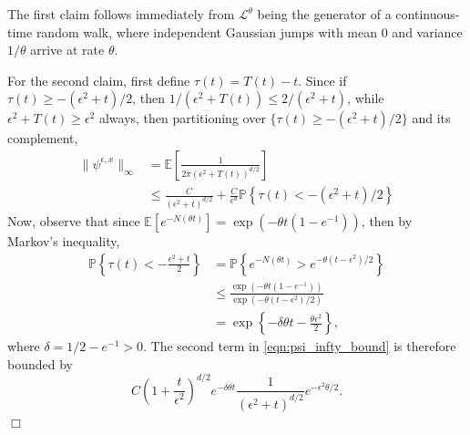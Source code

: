 \documentclass[12pt]{article}
\newenvironment {proof}{{\noindent\bf Proof }}{\hfill $\Box$ \medskip}
\newcommand{\IP}{\mathbb P}
\newcommand{\IE}{\mathbb E}
\begin{document}
\begin{proof}
    The first claim follows immediately from $\mathcal{L}^\theta$ being the generator
    of a continuous-time random walk,
    where independent Gaussian jumps with mean $0$ and variance $1/\theta$
    arrive at rate $\theta$.

    For the second claim, first define $\tau(t) = T(t)-t$.
    Since if $\tau(t) \ge -(\epsilon^2 + t)/2$,
    then $1/(\epsilon^2 + T(t)) \le 2/(\epsilon^2 + t)$,
    while $\epsilon^2 + T(t) \ge \epsilon^2$ always,
    then partitioning over
    $\{ \tau(t) \ge -(\epsilon^2 + t)/2 \}$ and its complement,
    \begin{align}
    \| \psi^{\epsilon,x} \|_\infty
    &=
        \IE\left[ 
            \frac{1}{2 \pi (\epsilon^2+T(t))^{d/2}}
        \right] \nonumber
    \\ & \le
        \frac{C}{(\epsilon^2 + t)^{d/2}}
        + 
        \frac{C}{\epsilon^d}
        \IP\left\{
            \tau(t) < - (\epsilon^2 + t) / 2
        \right\} \label{eqn:psi_infty_bound}
    \end{align}
    Now, observe that since $\IE[e^{-N(\theta t)}] = \exp(-\theta t (1 - e^{-1}))$,
    then by Markov's inequality,
    \begin{align*}
        \IP\left\{
            \tau(t) < - \frac{\epsilon^2 + t}{2}
        \right\}
        &=
        \IP\left\{
            e^{-N(\theta t)} > e^{-\theta (t - \epsilon^2) / 2}
        \right\}
        \\&\le
        \frac{
            \exp(- \theta t(1 - e^{-1}))
        }{
            \exp(- \theta (t - \epsilon^2) / 2)
        }
        \\&=
        \exp\left\{ - \delta \theta t - \frac{\theta \epsilon^2}{2} \right\} ,
    \end{align*}
    where $\delta = 1/2 - e^{-1} > 0$.
    The second term in \eqref{eqn:psi_infty_bound} is therefore bounded by
    \[
        C \left(1 + \frac{t}{\epsilon^2}\right)^{d/2} e^{-\delta \theta t}
        \frac{1}{(\epsilon^2 + t)^{d/2}} e^{-\epsilon^2 \theta / 2} .
\]
\end{proof}
\end{document}
